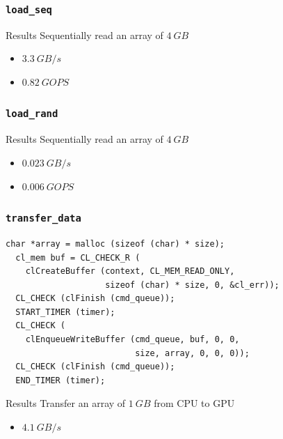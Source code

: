 \begin{frame}[fragile]
  \frametitle{\texttt{load\_seq}}
  
  \pause{}
  \begin{alertblock}{Results}
    Sequentially read an array of \(4~\mathit{GB}\)
    \begin{itemize}
    \item \(3.3~\mathit{GB/s}\)
    \item \(0.82~\mathit{GOPS}\)
    \end{itemize}
  \end{alertblock}
\end{frame}

\begin{frame}[fragile]
  \frametitle{\texttt{load\_rand}}
  
  \pause{}
  \begin{alertblock}{Results}
    Sequentially read an array of \(4~\mathit{GB}\)
    \begin{itemize}
    \item \(0.023~\mathit{GB/s}\)
    \item \(0.006~\mathit{GOPS}\)
    \end{itemize}
  \end{alertblock}
\end{frame}

\begin{frame}[fragile]
  \frametitle{\texttt{transfer\_data}}
\begin{lstlisting}[basicstyle=\footnotesize]
  char *array = malloc (sizeof (char) * size);
  cl_mem buf = CL_CHECK_R (
    clCreateBuffer (context, CL_MEM_READ_ONLY,
                    sizeof (char) * size, 0, &cl_err));
  CL_CHECK (clFinish (cmd_queue));
  START_TIMER (timer);
  CL_CHECK (
    clEnqueueWriteBuffer (cmd_queue, buf, 0, 0,
                          size, array, 0, 0, 0));
  CL_CHECK (clFinish (cmd_queue));
  END_TIMER (timer);
\end{lstlisting}
  \pause{}
  \begin{alertblock}{Results}
    Transfer an array of \(1~\mathit{GB}\) from CPU to GPU
    \begin{itemize}
    \item \(4.1~\mathit{GB/s}\)
    \end{itemize}
  \end{alertblock}
\end{frame}

